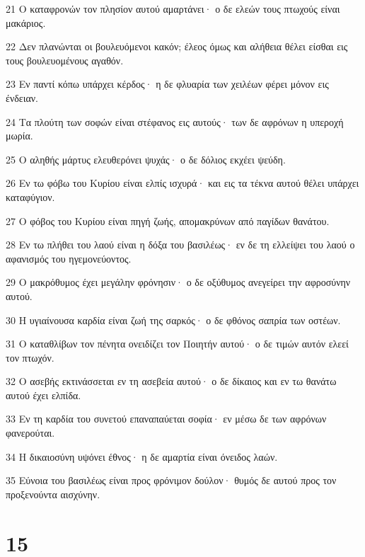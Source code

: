 \par 21 Ο καταφρονών τον πλησίον αυτού αμαρτάνει· ο δε ελεών τους πτωχούς είναι μακάριος.
\par 22 Δεν πλανώνται οι βουλευόμενοι κακόν; έλεος όμως και αλήθεια θέλει είσθαι εις τους βουλευομένους αγαθόν.
\par 23 Εν παντί κόπω υπάρχει κέρδος· η δε φλυαρία των χειλέων φέρει μόνον εις ένδειαν.
\par 24 Τα πλούτη των σοφών είναι στέφανος εις αυτούς· των δε αφρόνων η υπεροχή μωρία.
\par 25 Ο αληθής μάρτυς ελευθερόνει ψυχάς· ο δε δόλιος εκχέει ψεύδη.
\par 26 Εν τω φόβω του Κυρίου είναι ελπίς ισχυρά· και εις τα τέκνα αυτού θέλει υπάρχει καταφύγιον.
\par 27 Ο φόβος του Κυρίου είναι πηγή ζωής, απομακρύνων από παγίδων θανάτου.
\par 28 Εν τω πλήθει του λαού είναι η δόξα του βασιλέως· εν δε τη ελλείψει του λαού ο αφανισμός του ηγεμονεύοντος.
\par 29 Ο μακρόθυμος έχει μεγάλην φρόνησιν· ο δε οξύθυμος ανεγείρει την αφροσύνην αυτού.
\par 30 Η υγιαίνουσα καρδία είναι ζωή της σαρκός· ο δε φθόνος σαπρία των οστέων.
\par 31 Ο καταθλίβων τον πένητα ονειδίζει τον Ποιητήν αυτού· ο δε τιμών αυτόν ελεεί τον πτωχόν.
\par 32 Ο ασεβής εκτινάσσεται εν τη ασεβεία αυτού· ο δε δίκαιος και εν τω θανάτω αυτού έχει ελπίδα.
\par 33 Εν τη καρδία του συνετού επαναπαύεται σοφία· εν μέσω δε των αφρόνων φανερούται.
\par 34 Η δικαιοσύνη υψόνει έθνος· η δε αμαρτία είναι όνειδος λαών.
\par 35 Εύνοια του βασιλέως είναι προς φρόνιμον δούλον· θυμός δε αυτού προς τον προξενούντα αισχύνην.

\chapter{15}

